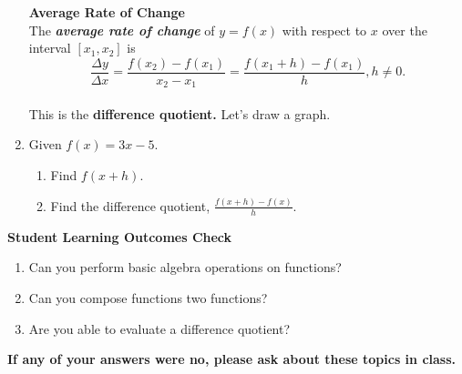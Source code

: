 \begin{enumerate}
\textbf{Average Rate of Change}\\


 The \textbf{\emph{average rate of change}} of $y=f(x)$ with respect to $x$ over the interval $[x_1,x_2]$ is
 $$\frac{\Delta y}{\Delta x}=\frac{f(x_2)-f(x_1)}{x_2-x_1}=\frac{f(x_1+h)-f(x_1)}{h}, h\neq 0.$$\\ 
 
 This is the \textbf{difference quotient.}  Let's draw a graph.
 \vfill
 
 \item Given $f(x)=3x-5$.
 \begin{enumerate}
 \item Find $f(x+h)$.\\[.5in]
 \item Find the difference quotient, $\frac{f(x+h)-f(x)}{h}$.\\[1.5in]
 \end{enumerate}





\end{enumerate}

\noindent \textbf{Student Learning Outcomes Check}

\begin{enumerate}
\item Can you perform basic algebra operations on functions?
\item Can you compose functions two functions?
\item Are you able to evaluate a difference quotient?


\end{enumerate}

\noindent \textbf{If any of your answers were no, please ask about these topics in class.}


